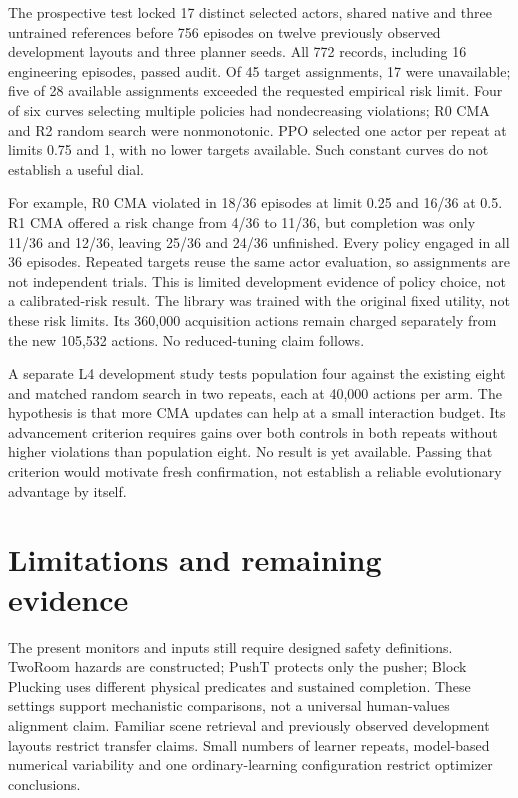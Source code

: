 \documentclass[sigconf,nonacm]{acmart}
\begin{document}
The prospective test locked 17 distinct selected actors, shared native and
three untrained references before 756 episodes on twelve previously observed
development layouts and three planner seeds. All 772 records, including 16
engineering episodes, passed audit. Of 45 target assignments, 17 were unavailable;
five of 28 available assignments exceeded the requested empirical risk limit.
Four of six curves selecting multiple policies had nondecreasing violations;
R0 CMA and R2 random search were nonmonotonic. PPO selected one actor per repeat
at limits 0.75 and 1, with no lower targets available. Such constant curves do not
establish a useful dial.

For example, R0 CMA violated in 18/36 episodes at limit 0.25 and 16/36 at 0.5.
R1 CMA offered a risk change from 4/36 to 11/36, but completion was only 11/36
and 12/36, leaving 25/36 and 24/36 unfinished. Every policy engaged in all 36
episodes. Repeated targets reuse the same actor evaluation, so assignments are
not independent trials. This is limited development evidence of policy choice,
not a calibrated-risk result. The library was trained with the original fixed
utility, not these risk limits. Its 360,000 acquisition actions remain charged
separately from the new 105,532 actions. No reduced-tuning claim follows.

A separate L4 development study tests population four against the existing eight
and matched random search in two repeats, each at 40,000 actions per arm. The
hypothesis is that more CMA updates can help at a small interaction budget.
Its advancement criterion requires gains over both controls in both repeats
without higher violations than population eight. No result is yet available.
Passing that criterion would motivate fresh confirmation, not establish a
reliable evolutionary advantage by itself.

\section{Limitations and remaining evidence}
The present monitors and inputs still require designed safety definitions.
TwoRoom hazards are constructed; PushT protects only the pusher; Block Plucking
uses different physical predicates and sustained completion. These settings support
mechanistic comparisons, not a universal human-values alignment claim. Familiar
scene retrieval and previously observed development layouts restrict transfer
claims. Small numbers of learner repeats, model-based numerical variability and
one ordinary-learning configuration restrict optimizer conclusions.
\end{document}
